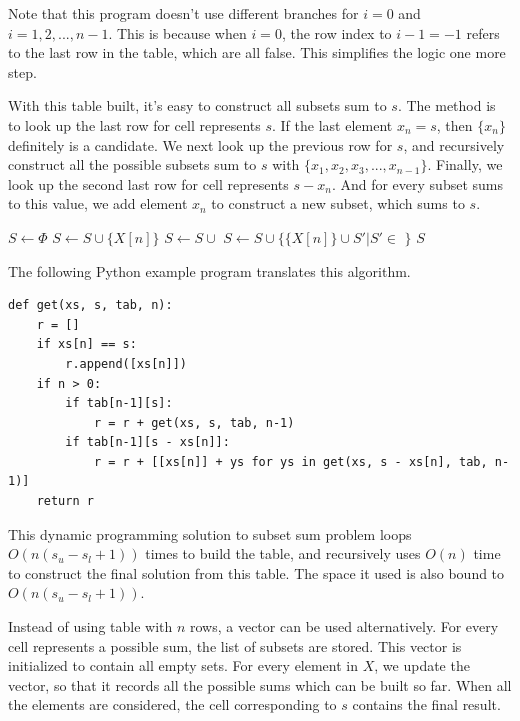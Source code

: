 \documentclass[UTF8]{article}
\begin{document}
Note that this program doesn't use different branches for $i = 0$ and $i = 1, 2, ..., n-1$. This
is because when $i = 0$, the row index to $i - 1 = -1$ refers to the last row in the table, which are
all false. This simplifies the logic one more step.

With this table built, it's easy to construct all subsets sum to $s$. The method is to look up
the last row for cell represents $s$. If the last element $x_n = s$, then $\{x_n\}$ definitely
is a candidate. We next look up the previous row for $s$, and recursively construct all the
possible subsets sum to $s$ with $\{x_1, x_2, x_3, ..., x_{n-1}\}$. Finally, we look up
the second last row for cell represents $s - x_n$. And for every subset sums to this value,
we add element $x_n$ to construct a new subset, which sums to $s$.

\begin{algorithmic}[1]
  \State $S \gets \Phi$
    \State $S \gets S \cup \{X[n]\}$
  \EndIf
      \State $S \gets S \cup $ 
    \EndIf
      \State $S \gets S \cup \{\{X[n]\} \cup S' | S' \in $  $\}$
    \EndIf
  \EndIf
  \State \Return $S$
\EndFunction
\end{algorithmic}

The following Python example program translates this algorithm.

\lstset{language=Python}
\begin{lstlisting}
def get(xs, s, tab, n):
    r = []
    if xs[n] == s:
        r.append([xs[n]])
    if n > 0:
        if tab[n-1][s]:
            r = r + get(xs, s, tab, n-1)
        if tab[n-1][s - xs[n]]:
            r = r + [[xs[n]] + ys for ys in get(xs, s - xs[n], tab, n-1)]
    return r
\end{lstlisting}

This dynamic programming solution to subset sum problem loops $O(n(s_u - s_l + 1))$ times
to build the table, and recursively uses $O(n)$ time to construct the final solution from this table.
The space it used is also bound to $O(n(s_u - s_l + 1))$.

Instead of using table with $n$ rows, a vector can be used alternatively. For every cell
represents a possible sum, the list of subsets are stored. This vector is initialized to contain
all empty sets. For every element in $X$, we update the vector, so that it records all the possible
sums which can be built so far. When all the elements are considered, the cell corresponding
to $s$ contains the final result.
\end{document}

